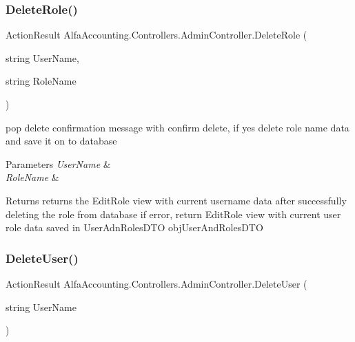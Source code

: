 \subsubsection{\texorpdfstring{Delete\+Role()}{DeleteRole()}}
{\footnotesize\ttfamily Action\+Result Alfa\+Accounting.\+Controllers.\+Admin\+Controller.\+Delete\+Role (\begin{DoxyParamCaption}\item[{string}]{User\+Name,  }\item[{string}]{Role\+Name }\end{DoxyParamCaption})}



pop delete confirmation message with confirm delete, if yes delete role name data and save it on to database 


\begin{DoxyParams}{Parameters}
{\em User\+Name} & \\
\hline
{\em Role\+Name} & \\
\hline
\end{DoxyParams}
\begin{DoxyReturn}{Returns}
returns the Edit\+Role view with current username data after successfully deleting the role from database if error, return Edit\+Role view with current user role data saved in User\+Adn\+Roles\+D\+TO obj\+User\+And\+Roles\+D\+TO
\end{DoxyReturn}
\mbox{\label{class_alfa_accounting_1_1_controllers_1_1_admin_controller_ab319343f23e122e5e097ab991d7b4570}} 
\subsubsection{\texorpdfstring{Delete\+User()}{DeleteUser()}\hspace{0.1cm}{\footnotesize\ttfamily [1/2]}}
{\footnotesize\ttfamily Action\+Result Alfa\+Accounting.\+Controllers.\+Admin\+Controller.\+Delete\+User (\begin{DoxyParamCaption}\item[{string}]{User\+Name }\end{DoxyParamCaption})}



